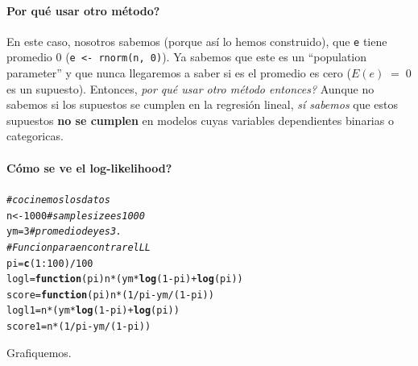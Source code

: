 \documentclass[onesided]{article}\usepackage[]{graphicx}\usepackage[]{color}
\makeatletter
\newcommand{\hlnum}[1]{\textcolor[rgb]{0.686,0.059,0.569}{#1}}%
\newcommand{\hlcom}[1]{\textcolor[rgb]{0.678,0.584,0.686}{\textit{#1}}}%
\newcommand{\hlopt}[1]{\textcolor[rgb]{0,0,0}{#1}}%
\newcommand{\hlstd}[1]{\textcolor[rgb]{0.345,0.345,0.345}{#1}}%
\newcommand{\hlkwa}[1]{\textcolor[rgb]{0.161,0.373,0.58}{\textbf{#1}}}%
\newcommand{\hlkwb}[1]{\textcolor[rgb]{0.69,0.353,0.396}{#1}}%
\newcommand{\hlkwc}[1]{\textcolor[rgb]{0.333,0.667,0.333}{#1}}%
\newcommand{\hlkwd}[1]{\textcolor[rgb]{0.737,0.353,0.396}{\textbf{#1}}}%
\newenvironment{kframe}{%
 \def\at@end@of@kframe{}%
 \ifinner\ifhmode%
  \def\at@end@of@kframe{\end{minipage}}%
  \begin{minipage}{\columnwidth}%
 \fi\fi%
 \def\FrameCommand##1{\hskip\@totalleftmargin \hskip-\fboxsep
 \colorbox{shadecolor}{##1}\hskip-\fboxsep
     \hskip-\linewidth \hskip-\@totalleftmargin \hskip\columnwidth}%
 \MakeFramed {\advance\hsize-\width
   \@totalleftmargin\z@ \linewidth\hsize
   \@setminipage}}%
 {\par\unskip\endMakeFramed%
 \at@end@of@kframe}
\newenvironment{knitrout}{}{} %
\makeatother
\begin{document}
\paragraph{Por qu\'e usar otro m\'etodo?} En este caso, nosotros sabemos (porque as\'i lo hemos construido), que \texttt{e} tiene promedio 0 (\texttt{e  <- rnorm(n, 0)}). Ya sabemos que este es un ``population parameter'' y que nunca llegaremos a saber si es el promedio es cero ($E(e)\;=\;0$ es un supuesto). Entonces, \emph{por qu\'e usar otro m\'etodo entonces?} Aunque no sabemos si los supuestos se cumplen en la regresi\'on lineal, \emph{s\'i sabemos} que estos supuestos {\bf no se cumplen} en modelos cuyas variables dependientes binarias o categoricas.

\paragraph{C\'omo se ve el log-likelihood?} 

\begin{knitrout}
\color{fgcolor}\begin{kframe}
\begin{alltt}
\hlcom{# cocinemos los datos}
\hlstd{n} \hlkwb{<-} \hlnum{1000} \hlcom{# sample size es 1000}
\hlstd{ym} \hlkwb{=} \hlnum{3} \hlcom{# promedio de y es 3.}
\hlcom{# Funcion para encontrar el LL}
\hlstd{pi}\hlkwb{=}\hlkwd{c}\hlstd{(}\hlnum{1}\hlopt{:}\hlnum{100}\hlstd{)}\hlopt{/}\hlnum{100}
\hlstd{logl}\hlkwb{=}\hlkwa{function}\hlstd{(}\hlkwc{pi}\hlstd{) n}\hlopt{*}\hlstd{(ym}\hlopt{*}\hlkwd{log}\hlstd{(}\hlnum{1}\hlopt{-}\hlstd{pi)}\hlopt{+}\hlkwd{log}\hlstd{(pi))}
\hlstd{score}\hlkwb{=}\hlkwa{function}\hlstd{(}\hlkwc{pi}\hlstd{) n}\hlopt{*}\hlstd{(}\hlnum{1}\hlopt{/}\hlstd{pi}\hlopt{-}\hlstd{ym}\hlopt{/}\hlstd{(}\hlnum{1}\hlopt{-}\hlstd{pi))}
\hlstd{logl1}\hlkwb{=}\hlstd{n}\hlopt{*}\hlstd{(ym}\hlopt{*}\hlkwd{log}\hlstd{(}\hlnum{1}\hlopt{-}\hlstd{pi)}\hlopt{+}\hlkwd{log}\hlstd{(pi))}
\hlstd{score1}\hlkwb{=}\hlstd{n}\hlopt{*}\hlstd{(}\hlnum{1}\hlopt{/}\hlstd{pi}\hlopt{-}\hlstd{ym}\hlopt{/}\hlstd{(}\hlnum{1}\hlopt{-}\hlstd{pi))}
\end{alltt}
\end{kframe}
\end{knitrout}

Grafiquemos.
\end{document}
